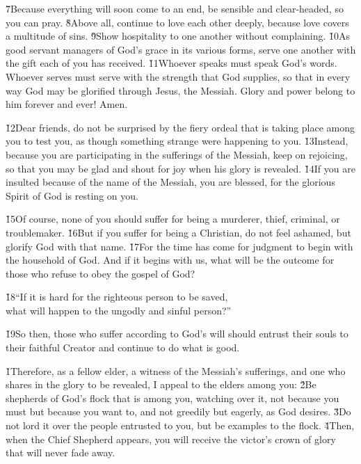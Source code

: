 \v{7}Because everything will soon come to an end, be sensible and clear-headed, so you can pray. \v{8}Above all, continue to love each other deeply, because love covers a multitude of sins. \v{9}Show hospitality to one another without complaining. \v{10}As good servant managers of God's grace in its various forms, serve one another with the gift each of you has received. \v{11}Whoever speaks must speak God's words. Whoever serves must serve with the strength that God supplies, so that in every way God may be glorified through Jesus, the Messiah. Glory and power belong to him forever and ever! Amen.

\v{12}Dear friends, do not be surprised by the fiery ordeal that is taking place among you to test you, as though something strange were happening to you. \v{13}Instead, because you are participating in the sufferings of the Messiah, keep on rejoicing, so that you may be glad and shout for joy when his glory is revealed. \v{14}If you are insulted because of the name of the Messiah, you are blessed, for the glorious Spirit of God is resting on you.

\v{15}Of course, none of you should suffer for being a murderer, thief, criminal, or troublemaker. \v{16}But if you suffer for being a Christian, do not feel ashamed, but glorify God with that name. \v{17}For the time has come for judgment to begin with the household of God. And if it begins with us, what will be the outcome for those who refuse to obey the gospel of God?

\begin{poetry}
\poeml \v{18}``If it is hard for the righteous person to be saved, \\
\poemll    what will happen to the ungodly and sinful person?''
\end{poetry}

\v{19}So then, those who suffer according to God's will should entrust their souls to their faithful Creator and continue to do what is good.

\v{1}Therefore, as a fellow elder, a witness of the Messiah's sufferings, and one who shares in the glory to be revealed, I appeal to the elders among you: \v{2}Be shepherds of God's flock that is among you, watching over it, not because you must but because you want to, and not greedily but eagerly, as God desires. \v{3}Do not lord it over the people entrusted to you, but be examples to the flock. \v{4}Then, when the Chief Shepherd appears, you will receive the victor's crown of glory that will never fade away.


